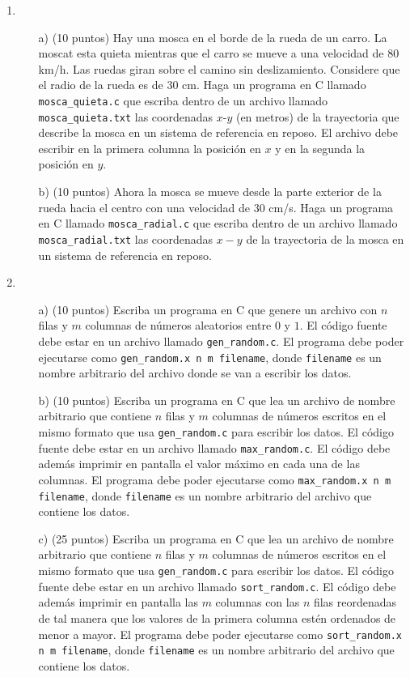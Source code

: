 \documentclass{article}
\begin{document}
\begin{enumerate}

\item 
\begin{itemize}
\item[a)] (10 puntos) Hay una mosca en el borde de la rueda de un
  carro. La moscat esta quieta mientras que el carro se mueve a una
  velocidad de $80$ km/h. Las ruedas giran sobre el camino sin
  deslizamiento. Considere que el radio de la rueda es de 30
  cm. Haga un programa en C llamado \verb"mosca_quieta.c" que
  escriba dentro de un archivo llamado \verb"mosca_quieta.txt" las
  coordenadas $x$-$y$ (en metros) de la trayectoria que describe la mosca en un
  sistema de referencia en reposo. El archivo debe escribir en la
  primera columna la posici\'on en $x$ y en la segunda la posici\'on
  en $y$.

\item[b)] (10 puntos) Ahora la mosca se mueve desde la parte exterior
  de la rueda hacia el centro con una velocidad de $30$ cm/s. Haga un
  programa en C llamado \verb"mosca_radial.c" que escriba dentro de un
  archivo llamado \verb"mosca_radial.txt" las coordenadas $x-y$ de la
  trayectoria de la mosca en un sistema de referencia en reposo. 
\end{itemize}

\item
\begin{itemize}
\item[a)] (10 puntos) Escriba un programa en C que genere un archivo
  con $n$ filas y $m$ columnas de n\'umeros aleatorios entre $0$ y
  $1$. El c\'odigo fuente debe estar en un archivo llamado
  \verb"gen_random.c". El programa debe poder ejecutarse como
  \verb"gen_random.x n m filename", donde \verb"filename" es un nombre
  arbitrario del archivo donde se van a escribir los datos. 

\item[b)] (10 puntos) 
Escriba un programa en C que lea un archivo de nombre arbitrario que
contiene $n$ filas y $m$ columnas de n\'umeros escritos en el mismo
formato que usa \verb"gen_random.c" para escribir los datos. El
c\'odigo fuente debe estar en un archivo llamado
\verb"max_random.c". El c\'odigo debe adem\'as imprimir en pantalla el
valor m\'aximo en cada una de las columnas. El programa debe poder
ejecutarse como \verb"max_random.x n m filename", donde
\verb"filename" es un nombre arbitrario del archivo que contiene los
datos. 

\item[c)] (25 puntos) Escriba un programa en C que lea un archivo de
  nombre arbitrario que contiene $n$ filas y $m$ columnas de n\'umeros
  escritos en el mismo formato que usa \verb"gen_random.c" para
  escribir los datos. El c\'odigo fuente debe estar en un archivo
  llamado \verb"sort_random.c". El c\'odigo debe adem\'as imprimir en
  pantalla las $m$ columnas con las $n$ filas reordenadas de tal
  manera que los valores de la primera columna est\'en ordenados de
  menor a mayor. El programa debe poder ejecutarse como 
  \verb"sort_random.x n m filename", donde \verb"filename" es un
  nombre arbitrario del archivo que contiene los datos. 


\end{itemize}
\end{enumerate}
\end{document}
